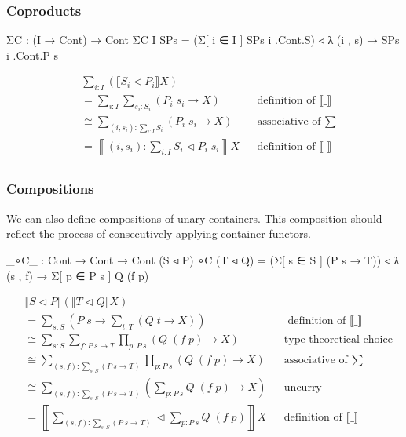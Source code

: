 {\subsubsection*{Coproducts}

\begin{code}
ΣC : (I → Cont) → Cont
ΣC {I} SPs = (Σ[ i ∈ I ] SPs i .Cont.S) ◃ λ (i , s) → SPs i .Cont.P s
\end{code}

\begin{align*}
& \sum_{i : I} (\llbracket S_i \triangleleft P_i \rrbracket X) \\
&= \sum_{i : I} \sum_{s_i : S_i} (P_i \; s_i \to X) && \text{definition of $\llbracket \_ \rrbracket$} \\
&\cong \sum_{(i , s_i) : \sum_{i : I} S_i} (P_i \; s_i \to X) && \text{associative of $\sum$} \\
&= \left\llbracket (i , s_i) : \sum_{i : I} S_i \triangleleft P_i \; s_i \right\rrbracket X && \text{definition of $\llbracket \_ \rrbracket$} \\
\end{align*}

\subsubsection*{Compositions}

We can also define compositions of unary containers. This composition should reflect the process of consecutively applying container functors.

\begin{code}
_∘C_ : Cont → Cont → Cont
(S ◃ P) ∘C (T ◃ Q) = (Σ[ s ∈ S ] (P s → T)) ◃ λ (s , f) → Σ[ p ∈ P s ] Q (f p)
\end{code}

\begin{align*}
& \llbracket S \triangleleft P \rrbracket (\llbracket T \triangleleft Q \rrbracket X) \\
&= \sum_{s : S} \left( P \; s \to \sum_{t : T} (Q \; t \to X) \right) && \text{ definition of $\llbracket \_ \rrbracket$} \\
&\cong \sum_{s : S} \sum_{f : P \: s \to T} \prod_{p : P \: s} (Q \; (f \; p) \to X) && \text{type theoretical choice} \\
&\cong \sum_{(s , f) : \sum_{s : S} ( P \: s \to T )} \prod_{p : P \: s} (Q \; (f \; p) \to X) && \text{associative of $\sum$} \\
&\cong \sum_{(s , f) : \sum_{s : S} ( P \: s \to T )} \left( \sum_{p : P \: s} Q \; (f \; p) \to X \right) && \text{uncurry} \\
&= \left\llbracket \sum_{(s , f) : \sum_{s : S} ( P \: s \to T )} \triangleleft \sum_{p : P \: s} Q \; (f \; p) \right\rrbracket X && \text{definition of $\llbracket \_ \rrbracket$} \\
\end{align*}

}
